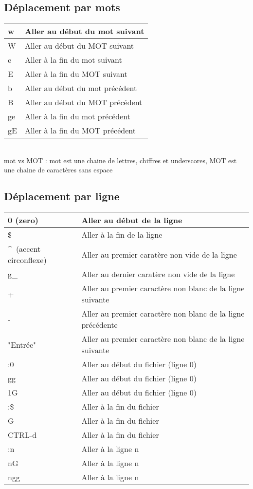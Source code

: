\documentclass{article}
\begin{document}
\subsection{Déplacement par mots}
\begin{tabular}{|p{3cm}| l| }
    \hline
    w & Aller au début du mot suivant\\ \hline
    W & Aller au début du MOT suivant\\ \hline
    e & Aller à la fin du mot suivant\\ \hline
    E & Aller à la fin du MOT suivant\\ \hline
    b & Aller au début du mot précédent\\ \hline
    B & Aller au début du MOT précédent\\ \hline
    ge & Aller à la fin du mot précédent\\ \hline
    gE & Aller à la fin du MOT précédent\\ \hline
\end{tabular}\\

mot vs MOT : mot est une chaine de lettres, chiffres et underscores, MOT est une chaine de caractères sans espace\\

\subsection{Déplacement par ligne}
\begin{tabular}{|p{3cm}| l| }
    \hline
    0 (zero) & Aller au début de la ligne \\ \hline
    \$ & Aller à la fin de la ligne \\ \hline
    \^~(accent circonflexe) & Aller au premier caratère non vide de la ligne \\ \hline
    g\_ & Aller au dernier caratère non vide de la ligne \\ \hline
    + & Aller au premier caractère non blanc de la ligne suivante \\ \hline
    - & Aller au premier caractère non blanc de la ligne précédente \\ \hline
    "Entrée" & Aller au premier caractère non blanc de la ligne suivante\\ \hline
    :0 & Aller au début du fichier (ligne 0) \\ \hline
    gg & Aller au début du fichier (ligne 0) \\ \hline
    1G & Aller au début du fichier (ligne 0) \\ \hline
    :\$ & Aller à la fin du fichier\\ \hline
    G & Aller à la fin du fichier\\ \hline
    CTRL-d & Aller à la fin du fichier\\ \hline
    :n & Aller à la ligne n\\ \hline
    nG & Aller à la ligne n\\ \hline
    ngg & Aller à la ligne n\\ \hline
\end{tabular}\\[0.5cm]
\end{document}
